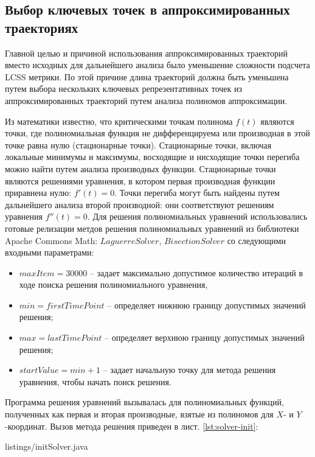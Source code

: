 \subsection{Выбор ключевых точек в аппроксимированных траекториях}

Главной целью и причиной использования аппроксимированных траекторий вместо исходных для дальнейшего анализа было уменьшение сложности подсчета LCSS метрики. По этой причине длина траекторий должна быть уменьшена путем выбора нескольких ключевых репрезентативных точек из аппроксимированных траекторий путем анализа полиномов аппроксимации.

Из математики известно, что критическими точкам полинома $f(t)$ являются точки, где полиномиальная функция не дифференцируема или производная в этой точке равна нулю (стационарные точки). Стационарные точки, включая локальные минимумы и максимумы, восходящие и нисходящие точки перегиба можно найти путем анализа производных функции. Стационарные точки являются решениями уравнения, в котором первая производная функции приравнена нулю: $f'(t) = 0$. Точки перегиба могут быть найдены путем дальнейшего анализа второй производной: они соответствуют решениям уравнения $f''(t) = 0$. Для решения полиномиальных уравнений использовались готовые релизации метдов решения полиномиальных уравнений из библиотеки Apache Commons Math: $LaguerreSolver$, $BisectionSolver$ со следующими входными параметрами:

\begin{itemize}
	\setlength\itemsep{-0.5em}
	\item $maxItem = 30000$ -- задает максимально допустимое количество итераций в ходе поиска решения полиномиального уравнения,
	\item $min = firstTimePoint$ -- определяет нижнюю границу допустимых значений решения;
	\item $max = lastTimePoint$ -- определяет верхнюю границу допустимых значений решения;
	\item $startValue = min + 1$ -- задает начальную точку для метода решения уравнения, чтобы начать поиск решения.
\end{itemize}

Программа решения уравнений вызывалась для полиномиальных функций, полученных как первая и вторая производные, взятые из полиномов для $X$- и $Y$-координат. Вызов метода решения приведен в лист. \ref{lst:solver-init}:

 {listings/initSolver.java}

